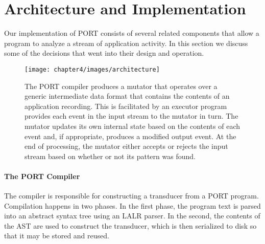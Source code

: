 \section{Architecture and Implementation}

Our implementation of PORT consists of several related
components that allow a program to analyze a stream of
application activity.
In this section we discuss some
of the decisions that went into their design and operation.
\label{SEC:architecture}

\begin{figure}[ht]
\centering
  \texttt{[image: chapter4/images/architecture]}
  \caption[Overview of PORT compiler and run-time components]{The PORT compiler produces a mutator that operates over a
   generic intermediate data format that contains the contents of an application
   recording.  This is facilitated by an executor program provides each
   event in the input stream to the mutator in turn.  The mutator updates
   its own internal state based on the contents of each event and, if
   appropriate, produces a modified output event.  At the end of processing,
   the mutator either accepts or rejects the input stream based on whether
   or not its pattern was found.}
  \label{fig:architecture}
\end{figure}

\paragraph{The PORT Compiler}
The compiler is responsible for constructing a transducer
from a PORT program.
Compilation happens in two phases.  In the first phase, the program text is
parsed into an abstract syntax tree using an LALR parser.
In the second, the
contents of the AST are used to construct the transducer, which is then serialized to
disk so that it may be stored and reused.

